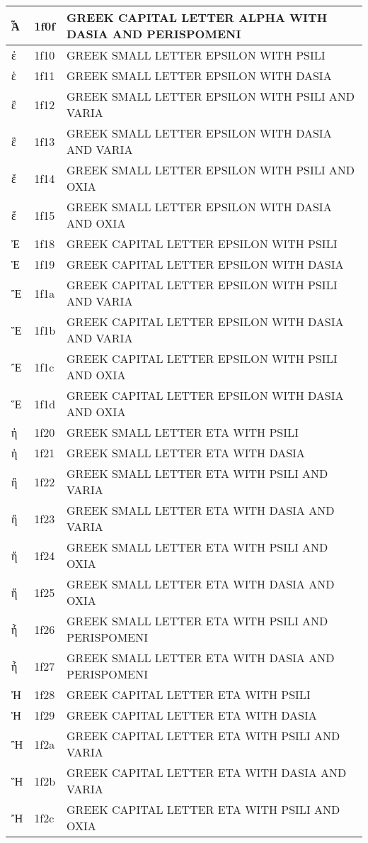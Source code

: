\documentclass[12pt,letterpaper,openany]{book}
\begin{document}
\begin{center}
\begin{supertabular}{|m{0.25in}|m{0.5in}|m{4in}|}
Ἇ & 1f0f & GREEK CAPITAL LETTER ALPHA WITH DASIA AND PERISPOMENI\\\hline
ἐ & 1f10 & GREEK SMALL LETTER EPSILON WITH PSILI\\\hline
ἑ & 1f11 & GREEK SMALL LETTER EPSILON WITH DASIA\\\hline
ἒ & 1f12 & GREEK SMALL LETTER EPSILON WITH PSILI AND VARIA\\\hline
ἓ & 1f13 & GREEK SMALL LETTER EPSILON WITH DASIA AND VARIA\\\hline
ἔ & 1f14 & GREEK SMALL LETTER EPSILON WITH PSILI AND OXIA\\\hline
ἕ & 1f15 & GREEK SMALL LETTER EPSILON WITH DASIA AND OXIA\\\hline
Ἐ & 1f18 & GREEK CAPITAL LETTER EPSILON WITH PSILI\\\hline
Ἑ & 1f19 & GREEK CAPITAL LETTER EPSILON WITH DASIA\\\hline
Ἒ & 1f1a & GREEK CAPITAL LETTER EPSILON WITH PSILI AND VARIA\\\hline
Ἓ & 1f1b & GREEK CAPITAL LETTER EPSILON WITH DASIA AND VARIA\\\hline
Ἔ & 1f1c & GREEK CAPITAL LETTER EPSILON WITH PSILI AND OXIA\\\hline
Ἕ & 1f1d & GREEK CAPITAL LETTER EPSILON WITH DASIA AND OXIA\\\hline
ἠ & 1f20 & GREEK SMALL LETTER ETA WITH PSILI\\\hline
ἡ & 1f21 & GREEK SMALL LETTER ETA WITH DASIA\\\hline
ἢ & 1f22 & GREEK SMALL LETTER ETA WITH PSILI AND VARIA\\\hline
ἣ & 1f23 & GREEK SMALL LETTER ETA WITH DASIA AND VARIA\\\hline
ἤ & 1f24 & GREEK SMALL LETTER ETA WITH PSILI AND OXIA\\\hline
ἥ & 1f25 & GREEK SMALL LETTER ETA WITH DASIA AND OXIA\\\hline
ἦ & 1f26 & GREEK SMALL LETTER ETA WITH PSILI AND PERISPOMENI\\\hline
ἧ & 1f27 & GREEK SMALL LETTER ETA WITH DASIA AND PERISPOMENI\\\hline
Ἠ & 1f28 & GREEK CAPITAL LETTER ETA WITH PSILI\\\hline
Ἡ & 1f29 & GREEK CAPITAL LETTER ETA WITH DASIA\\\hline
Ἢ & 1f2a & GREEK CAPITAL LETTER ETA WITH PSILI AND VARIA\\\hline
Ἣ & 1f2b & GREEK CAPITAL LETTER ETA WITH DASIA AND VARIA\\\hline
Ἤ & 1f2c & GREEK CAPITAL LETTER ETA WITH PSILI AND OXIA\\\hline

\end{supertabular}
\end{center}
\end{document}
